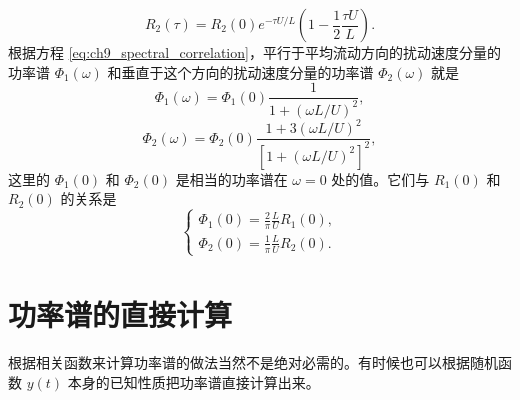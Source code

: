 \begin{equation}\label{eq:ch9_R2_turbulence}
R_2(\tau) = R_2(0) e^{-\tau U / L} \left( 1 - \frac{1}{2} \frac{\tau U}{L} \right).
\end{equation}
根据方程 \eqref{eq:ch9_spectral_correlation}，平行于平均流动方向的扰动速度分量的功率谱 $ \Phi_1(\omega) $ 和垂直于这个方向的扰动速度分量的功率谱 $ \Phi_2(\omega) $ 就是
\begin{equation}\label{eq:ch9_Phi1_turbulence}
\Phi_1(\omega) = \Phi_1(0) \frac{1}{1 + (\omega L / U)^2},
\end{equation}
\begin{equation}\label{eq:ch9_Phi2_turbulence}
\Phi_2(\omega) = \Phi_2(0) \frac{1 + 3 (\omega L / U)^2}{[1 + (\omega L / U)^2]^2},
\end{equation}
这里的 $ \Phi_1(0) $ 和 $ \Phi_2(0) $ 是相当的功率谱在 $ \omega=0 $ 处的值。它们与 $ R_1(0) $ 和 $ R_2(0) $ 的关系是
\begin{equation}\label{eq:ch9_Phi0_relation}
\begin{cases}
\Phi_1(0) = \frac{2}{\pi} \frac{L}{U} R_1(0), \\
\Phi_2(0) = \frac{1}{\pi} \frac{L}{U} R_2(0).
\end{cases}
\end{equation}

\section{功率谱的直接计算}

根据相关函数来计算功率谱的做法当然不是绝对必需的。有时候也可以根据随机函数 $ y(t) $ 本身的已知性质把功率谱直接计算出来。

